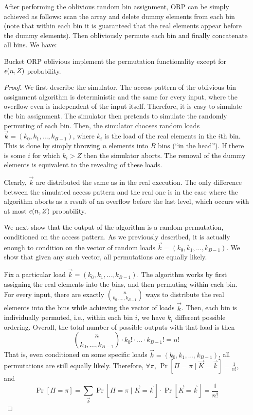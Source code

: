 After performing the oblivious random bin assignment, ORP can be simply achieved as follows:
scan the array and delete dummy elements from each bin (note that within each bin it is guaranteed that the real elements appear before the dummy elements). Then obliviously permute each bin and finally concatenate all bins.  We have:


\begin{lemma}
Bucket ORP oblivious implement the permutation functionality except for ${\epsilon}(n,Z)$ probability. 
\end{lemma}

\begin{proof}
We first describe the simulator. 
The access pattern of the oblivious bin assignment algorithm is deterministic and the same for every input, where the overflow even is independent of the input itself. Therefore, it is easy to simulate the bin assignment. 
The simulator then pretends to simulate the randomly permuting of each bin. 
Then, 
the simulator chooses random loads $\vec{k}=(k_0, k_1, \ldots, k_{B-1})$, where $k_i$ is the load of the real elements in the $i$th bin. This is done by simply throwing $n$ elements into $B$ bins (``in the head''). If there is some $i$ for which $k_i > Z$ then the simulator aborts. The removal of the dummy elements is equivalent to the revealing of these loads. 

Clearly, $\vec{k}$ are distributed the same as in the real execution. The only difference between the simulated access pattern and the real one is in the case where the algorithm aborts as a result of an overflow before the last level, which occurs with at most ${\epsilon}(n,Z)$ probability. 

We next show that the output of the algorithm is a random permutation, conditioned on the access pattern. As we previously described, it is actually enough to condition on the vector of random loads $\vec{k}=(k_0, k_1, \ldots, k_{B-1})$. We show that given any such vector, all permutations are equally likely.  

Fix a particular load $\vec{k}=(k_0, k_1, \ldots, k_{B-1})$. The algorithm works by first assigning the real elements into the bins, and then permuting within each bin. For every input, there are exactly ${n \choose k_0,\ldots,k_{B-1}}$ ways to distribute the real elements into the bins while achieving the vector of loads $\vec{k}$. Then, each bin is individually permuted, i.e., within each bin $i$, we have $k_i$ different possible ordering. Overall, 
the total number of possible outputs with that load is then
\[{n \choose k_0,\ldots,k_{B-1}} \cdot k_0! \cdot \ldots \cdot k_{B-1}! = n!\]
That is, even conditioned on some specific loads $\vec{k}=(k_0, k_1, \ldots, k_{B-1})$, all permutations are still equally likely.
Therefore, $\forall \pi$, $\Pr\left[\Pi = \pi \mid \vec{K}=\vec{k} \right] = \frac 1 {n!}$, and
\[ \Pr\left[\Pi = \pi\right] = \sum_{\vec{k}} \Pr\left[\Pi = \pi \mid \vec{K}=\vec{k} \right] \cdot \Pr\left[\vec{K}=\vec{k}\right] = \frac {1}{n!} \]


\end{proof}
